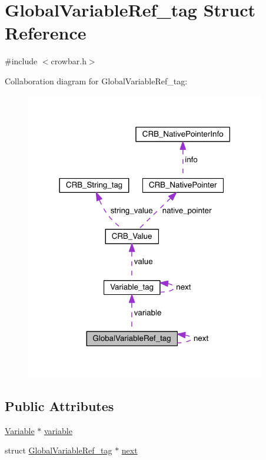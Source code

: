 \hypertarget{struct_global_variable_ref__tag}{}\section{Global\+Variable\+Ref\+\_\+tag Struct Reference}
\label{struct_global_variable_ref__tag}


{\ttfamily \#include $<$crowbar.\+h$>$}



Collaboration diagram for Global\+Variable\+Ref\+\_\+tag\+:\nopagebreak
\begin{figure}[H]
\begin{center}
\leavevmode
\includegraphics[width=297pt]{struct_global_variable_ref__tag__coll__graph}
\end{center}
\end{figure}
\subsection*{Public Attributes}
\begin{DoxyCompactItemize}
\item 
\hyperlink{crowbar_8h_a070c86ad7ae39536aed471927d04dee4}{Variable} $\ast$ \hyperlink{struct_global_variable_ref__tag_aa1dd1472b8328df21455bffc4d2a4c12}{variable}
\item 
struct \hyperlink{struct_global_variable_ref__tag}{Global\+Variable\+Ref\+\_\+tag} $\ast$ \hyperlink{struct_global_variable_ref__tag_aaadfe23f53ea5a6ed782d89a689cf47d}{next}
\end{DoxyCompactItemize}


